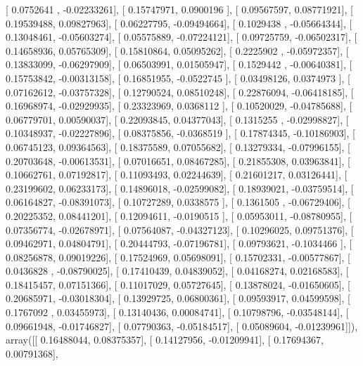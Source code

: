 \documentclass{article}
\begin{document}
       [ 0.0752641 , -0.02233261],
       [ 0.15747971,  0.0900196 ],
       [ 0.09567597,  0.08771921],
       [ 0.19539488,  0.09827963],
       [ 0.06227795, -0.09494664],
       [ 0.1029438 , -0.05664344],
       [ 0.13048461, -0.05603274],
       [ 0.05575889, -0.07224121],
       [ 0.09725759, -0.06502317],
       [ 0.14658936,  0.05765309],
       [ 0.15810864,  0.05095262],
       [ 0.2225902 , -0.05972357],
       [ 0.13833099, -0.06297909],
       [ 0.06503991,  0.01505947],
       [ 0.1529442 , -0.00640381],
       [ 0.15753842, -0.00313158],
       [ 0.16851955, -0.0522745 ],
       [ 0.03498126,  0.0374973 ],
       [ 0.07162612, -0.03757328],
       [ 0.12790524,  0.08510248],
       [ 0.22876094, -0.06418185],
       [ 0.16968974, -0.02929935],
       [ 0.23323969,  0.0368112 ],
       [ 0.10520029, -0.04785688],
       [ 0.06779701,  0.00590037],
       [ 0.22093845,  0.04377043],
       [ 0.1315255 , -0.02998827],
       [ 0.10348937, -0.02227896],
       [ 0.08375856, -0.0368519 ],
       [ 0.17874345, -0.10186903],
       [ 0.06745123,  0.09364563],
       [ 0.18375589,  0.07055682],
       [ 0.13279334, -0.07996155],
       [ 0.20703648, -0.00613531],
       [ 0.07016651,  0.08467285],
       [ 0.21855308,  0.03963841],
       [ 0.10662761,  0.07192817],
       [ 0.11093493,  0.02244639],
       [ 0.21601217,  0.03126441],
       [ 0.23199602,  0.06233173],
       [ 0.14896018, -0.02599082],
       [ 0.18939021, -0.03759514],
       [ 0.06164827, -0.08391073],
       [ 0.10727289,  0.0338575 ],
       [ 0.1361505 , -0.06729406],
       [ 0.20225352,  0.08441201],
       [ 0.12094611, -0.0190515 ],
       [ 0.05953011, -0.08780955],
       [ 0.07356774, -0.02678971],
       [ 0.07564087, -0.04327123],
       [ 0.10296025,  0.09751376],
       [ 0.09462971,  0.04804791],
       [ 0.20444793, -0.07196781],
       [ 0.09793621, -0.1034466 ],
       [ 0.08256878,  0.09019226],
       [ 0.17524969,  0.05698091],
       [ 0.15702331, -0.00577867],
       [ 0.0436828 , -0.08790025],
       [ 0.17410439,  0.04839052],
       [ 0.04168274,  0.02168583],
       [ 0.18415457,  0.07151366],
       [ 0.11017029,  0.05727645],
       [ 0.13878024, -0.01650605],
       [ 0.20685971, -0.03018304],
       [ 0.13929725,  0.06800361],
       [ 0.09593917,  0.04599598],
       [ 0.1767092 ,  0.03455973],
       [ 0.13140436,  0.00084741],
       [ 0.10798796, -0.03548144],
       [ 0.09661948, -0.01746827],
       [ 0.07790363, -0.05184517],
       [ 0.05089604, -0.01239961]]), array([[ 0.16488044,  0.08375357],
       [ 0.14127956, -0.01209941],
       [ 0.17694367,  0.00791368],
\end{document}

